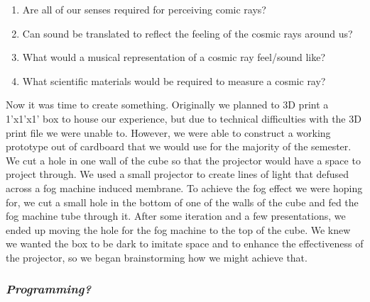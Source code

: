 \documentclass{article}
\begin{document}
\begin{enumerate}
    \item Are all of our senses required for perceiving comic rays?
    \item Can sound be translated to reflect the feeling of the cosmic rays around us? 
    \item What would a musical representation of a cosmic ray feel/sound like? 
    \item What scientific materials would be required to measure a cosmic ray?
\end{enumerate}
Now it was time to create something. Originally we planned to 3D print a 1’x1’x1’ box to house our experience, but due to technical difficulties with the 3D print file we were unable to. However, we were able to construct a working prototype out of cardboard that we would use for the majority of the semester. We cut a hole in one wall of the cube so that the projector would have a space to project through. We used a small projector to create lines of light that defused across a fog machine induced membrane. To achieve the fog effect we were hoping for, we cut a small hole in the bottom of one of the walls of the cube and fed the fog machine tube through it. After some iteration and a few presentations, we ended up moving the hole for the fog machine to the top of the cube. We knew we wanted the box to be dark to imitate space and to enhance the effectiveness of the projector, so we began brainstorming how we might achieve that.

\subsubsection{\textit{Programming?}}
\end{document}
